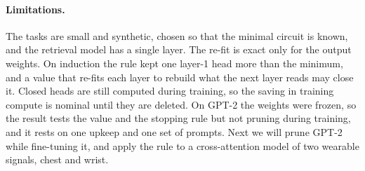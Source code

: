 \documentclass[letterpaper]{article} %
\begin{document}
\paragraph{Limitations.} The tasks are small and synthetic, chosen so that the minimal circuit is known, and the retrieval model has a single layer. The re-fit is exact only for the output weights. On induction the rule kept one layer-1 head more than the minimum, and a value that re-fits each layer to rebuild what the next layer reads may close it. Closed heads are still computed during training, so the saving in training compute is nominal until they are deleted. On GPT-2 the weights were frozen, so the result tests the value and the stopping rule but not pruning during training, and it rests on one upkeep and one set of prompts. Next we will prune GPT-2 while fine-tuning it, and apply the rule to a cross-attention model of two wearable signals, chest and wrist.


\end{document}

